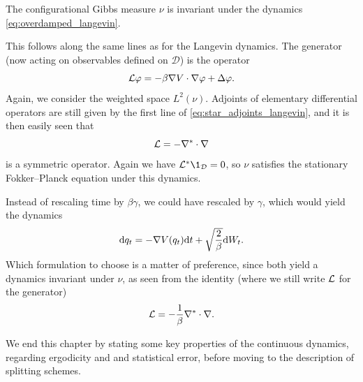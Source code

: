         \begin{prop}
            The configurational Gibbs measure $\nu$ is invariant under the dynamics \eqref{eq:overdamped_langevin}.
        \end{prop}
    
        This follows along the same lines as for the Langevin dynamics. The generator (now acting on observables defined on $\mathcal D$) is the operator
        \begin{equation}
            \label{eq:overdamped_langevin_generator}
            \mathcal{L}\varphi=-\beta\nabla V\cdot \nabla\varphi + \Delta \varphi.
        \end{equation}
        Again, we consider the weighted space $L^2(\nu)$. Adjoints of elementary differential operators are still given by the first line of \eqref{eq:star_adjoints_langevin}, and it is then easily seen that
        \begin{equation}
            \label{eq:L_overdamped_symmetric}
            \mathcal{L}=-\nabla^*\cdot\nabla
        \end{equation}
        is a symmetric operator. Again we have $\cL^*\1_{\mathcal D}=0$, so $\nu$ satisfies the stationary Fokker--Planck equation under this dynamics.
    
        \begin{remark}
            Instead of rescaling time by $\beta\gamma$, we could have rescaled by $\gamma$, which would yield the dynamics
            \begin{equation}
                \label{eq:overdamped_langevin_alt}
                \mathrm{d} q_t=-\nabla V(q_t)\mathrm{d} t+\sqrt{\frac 2\beta}\mathrm{d} W_t.
            \end{equation}
            Which formulation to choose is a matter of preference, since both yield a dynamics invariant under $\nu$, as seen from the identity (where we still write $\mathcal{L}$ for the generator)
            \[\mathcal{L}=-\frac1\beta\nabla^*\cdot\nabla.\]
        \end{remark}
        We end this chapter by stating some key properties of the continuous dynamics, regarding ergodicity and and statistical error, before moving to the description of splitting schemes. 

